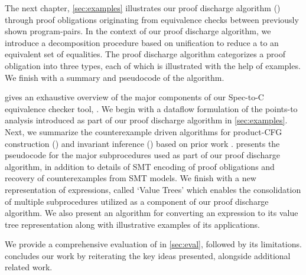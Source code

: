The next chapter, \cref{sec:examples} illustrates our proof discharge algorithm () through
proof obligations originating from equivalence checks between previously shown program-pairs.
In the context of our proof discharge algorithm, we introduce a decomposition procedure based on unification
to reduce a \recursiveRelation{} to an equivalent set of equalities.
The proof discharge algorithm categorizes a proof obligation into three types, each of which is
illustrated with the help of examples.
We finish with a summary and pseudocode of the algorithm.

 gives an exhaustive overview of the major components of our Spec-to-C equivalence checker tool, \toolName{}.
We begin with a dataflow formulation of the points-to analysis introduced as part of our proof discharge algorithm in \cref{sec:examples}.
Next, we summarize the counterexample driven algorithms for product-CFG construction ()
and invariant inference () based on prior work \cite{shubhanipdhthesis}.
 presents the pseudocode for the major subprocedures used as part of our
proof discharge algorithm, in addition to details of SMT encoding of proof obligations and
recovery of counterexamples from SMT models.
We finish with a new representation of expressions, called `Value Trees' which enables the consolidation
of multiple subprocedures utilized as a component of our proof discharge algorithm.
We also present an algorithm for converting an expression to its value tree representation
along with illustrative examples of its applications.

We provide a comprehensive evaluation of \toolName{} in \cref{sec:eval}, followed by its limitations.
 concludes our work by reiterating the key ideas presented, alongside additional related work.
